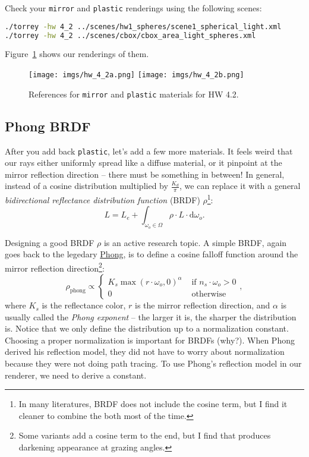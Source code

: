 Check your \lstinline{mirror} and \lstinline{plastic} renderings using the following scenes:
\begin{lstlisting}[language=bash]
./torrey -hw 4_2 ../scenes/hw1_spheres/scene1_spherical_light.xml
./torrey -hw 4_2 ../scenes/cbox/cbox_area_light_spheres.xml
\end{lstlisting}
Figure~\ref{fig:hw_4_2_mirror_plastic} shows our renderings of them.

\begin{figure}[ht]
    \centering
    \texttt{[image: imgs/hw\_4\_2a.png]}
    \texttt{[image: imgs/hw\_4\_2b.png]}
    \caption{References for \lstinline{mirror} and \lstinline{plastic} materials for HW 4.2.}
    \label{fig:hw_4_2_mirror_plastic}
\end{figure}

\subsection{Phong BRDF}
After you add back \lstinline{plastic}, let's add a few more materials. It feels weird that our rays either uniformly spread like a diffuse material, or it pinpoint at the mirror reflection direction -- there must be something in between! In general, instead of a cosine distribution multiplied by $\frac{K_d}{\pi}$, we can replace it with a general \emph{bidirectional reflectance distribution function} (BRDF) $\rho$\footnote{In many literatures, BRDF does not include the cosine term, but I find it cleaner to combine the both most of the time.}:
\begin{equation}
L = L_e + \int_{\omega_o \in \Omega} \rho \cdot L \cdot \mathrm{d}\omega_o.
\label{eq:rendering_equation}
\end{equation}

Designing a good BRDF $\rho$ is an active research topic. A simple BRDF, again goes back to the legedary \href{https://en.wikipedia.org/wiki/Phong_reflection_model}{Phong}, is to define a cosine falloff function around the mirror reflection direction\footnote{Some variants add a cosine term to the end, but I find that produces darkening appearance at grazing angles.}:
\begin{equation}
\rho_{\text{phong}} \propto \begin{cases}
K_s \max\left(r \cdot \omega_o, 0\right)^\alpha & \text{ if } n_s \cdot \omega_o > 0 \\
0 & \text{ otherwise} 
\end{cases},
\end{equation}
where $K_s$ is the reflectance color, $r$ is the mirror reflection direction, and $\alpha$ is usually called the \emph{Phong exponent} -- the larger it is, the sharper the distribution is. Notice that we only define the distribution up to a normalization constant. Choosing a proper normalization is important for BRDFs (why?). When Phong derived his reflection model, they did not have to worry about normalization because they were not doing path tracing. To use Phong's reflection model in our renderer, we need to derive a constant.

